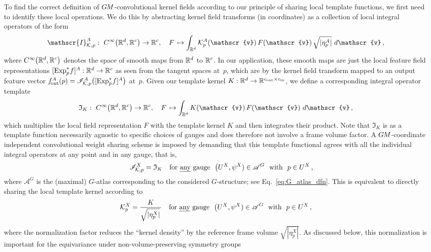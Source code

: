 To find the correct definition of $G\mkern-1.4muM$-convolutional kernel fields according to our principle of sharing local template functions, we first need to identify these local operations.
We do this by abstracting kernel field transforms (in coordinates) as a collection of local integral operators of the form
\begin{align}\label{eq:local_integral_operator_general}
    \mathscr{I}_{\K,p}^A:\ 
    C^\infty \big(\R^d, \R^c\big) \to \R^c, \quad
    F \,\mapsto \int_{\R^d} \Kp^A(\mathscr{v})\, F(\mathscr{v})\, \sqrt{|\eta_p^A|}\ d\mathscr{v} \,,
\end{align}
where $C^\infty \big(\mathbb{R}^d, \mathbb{R}^c\big)$ denotes the space of smooth maps from $\mathbb{R}^d$ to $\mathbb{R}^c$.
In our application, these smooth maps are just the local feature field representations $[\operatorname{Exp}^*_p\mkern-2mu f]^A: \mathbb{R}^d \to \mathbb{R}^c$ as seen from the tangent spaces at~$p$, which are by the kernel field transform mapped to an output feature vector $f_\textup{\:\!\!out}^A(p) = \mathscr{I}_{\mathcal{K},p}^A \big([\operatorname{Exp}^*_p\mkern-2mu f]^A\big)$ at~$p$.
Given our template kernel $K: \mathbb{R}^d \to \mathbb{R}^{{c_\textup{out}}\times{c_\textup{in}}}$, we define a corresponding integral operator template
\begin{align}\label{eq:local_integral_operator_template}
    \mathfrak{I}_K:\ 
    C^\infty \big(\R^d, \R^c\big) \to \R^c, \quad
    F \,\mapsto \int_{\R^d} K(\mathscr{v})\, F(\mathscr{v})\ d\mathscr{v} \,,
\end{align}
which multiplies the local field representation $F$ with the template kernel $K$ and then integrates their product.
Note that $\mathfrak{I}_K$ is as a template function necessarily agnostic to specific choices of gauges and does therefore not involve a frame volume factor.
A $G\mkern-1.4muM$-coordinate independent convolutional weight sharing scheme is imposed by demanding that this template functional agrees with all the individual integral operators at any point and in any gauge, that is,
\begin{align}\label{eq:weight_sharing_integral_operator}
    \mkern28mu
    \mathscr{I}_{\mathcal{K},p}^X = \mathfrak{I}_K
    \quad \textup{for \emph{any} gauge}\ \ \big(U^X,\psi^X) \in \mathscr{A}^G\ \ \textup{with}\ \ p\in U^X \,,
\end{align}
where $\mathscr{A}^G$ is the (maximal) $G$-atlas corresponding to the considered $G$-structure; see Eq.~\eqref{eq:G_atlas_dfn}.
This is equivalent to directly sharing the local template kernel according to
\begin{align}\label{eq:weight_sharing_kernel}
    \mathcal{K}_p^X = \frac{K}{\sqrt{|\eta_p^X|}\,}
    \quad \textup{for \emph{any} gauge}\ \ \big(U^X,\psi^X) \in \mathscr{A}^G\ \ \textup{with}\ \ p\in U^X \,,
\end{align}
where the normalization factor reduces the ``kernel density'' by the reference frame volume $\sqrt{|\eta_p^X|}$.
As discussed below, this normalization is important for the equivariance under non-volume-preserving symmetry groups


